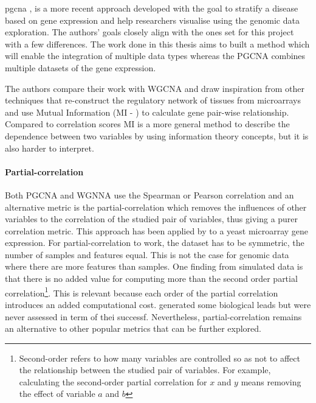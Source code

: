 \acrlong{pgcna} \citep{Care2019-ij}, is a more recent approach developed with the goal to stratify a disease based on gene expression and help researchers visualise using the genomic data exploration. The authors' goals closely align with the ones set for this project with a few differences. The work done in this thesis aims to built a method which will enable the integration of multiple data types whereas the PGCNA combines multiple datasets of the gene expression. 

The authors compare their work with WGCNA and draw inspiration from other techniques that re-construct the regulatory network of tissues from microarrays and use Mutual Information (MI - \citet{Margolin2006-mc,Zhang2013-fs}) to calculate gene pair-wise relationship. Compared to correlation scores MI is a more general method to describe the dependence between two variables by using information theory concepts, but it is also harder to interpret.


\paragraph*{Partial-correlation} \label{s:lit:partial-corr}

Both PGCNA and WGNNA use the Spearman or Pearson correlation and an alternative metric is the partial-correlation which removes the influences of other variables to the correlation of the studied pair of variables, thus giving a purer correlation metric. This approach has been applied by \citet{De_la_Fuente2004-ts} to a yeast microarray gene expression.  For partial-correlation to work, the dataset has to be symmetric, the number of samples and features equal. This is not the case for genomic data where there are more features than samples. One finding from simulated data is that there is no added value for computing more than the second order partial correlation\footnote{Second-order refers to how many variables are controlled so as not to affect the relationship between the studied pair of variables. For example, calculating the second-order partial correlation for $x$ and $y$ means removing the effect of variable $a$ and $b$}. This is relevant because each order of the partial correlation introduces an added computational cost. \citet{De_la_Fuente2004-ts} generated some biological leads but were never assessed in term of thei successf. Nevertheless, partial-correlation remains an alternative to other popular metrics that can be further explored.

